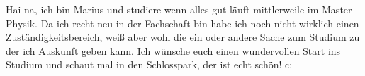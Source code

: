 \begin{multicols}{2}
{
Hai na, ich bin Marius und studiere wenn alles gut läuft mittlerweile im Master Physik. Da ich recht neu in der Fachschaft bin habe ich noch nicht wirklich einen Zuständigkeitsbereich, weiß aber wohl die ein oder andere Sache zum Studium zu der ich Auskunft geben kann. Ich wünsche euch einen wundervollen Start ins Studium und schaut mal in den Schlosspark, der ist echt schön! c:
}


\end{multicols}
